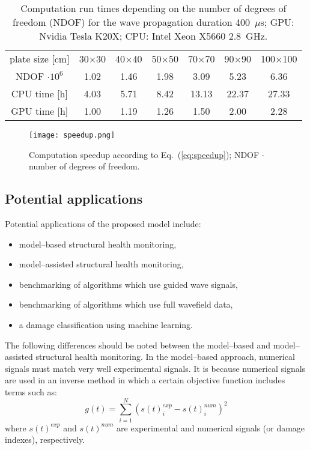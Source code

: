 \documentclass[preprint,12pt]{elsarticle}
\begin{document}
	\begin{table}
		\renewcommand{\arraystretch}{1.3}
		\centering \footnotesize
		\caption{Computation run times depending on the number of degrees of freedom (NDOF) for the wave propagation duration 400~$\mu$s; GPU: Nvidia Tesla K20X; CPU: Intel Xeon X5660 2.8~GHz.}
		\begin{tabular}{ccccccc} 
			\toprule	
			plate size [cm] & 30$\times$30  & 40$\times$40 & 50$\times$50 & 70$\times$70 & 90$\times$90 & 100$\times$100 \\
			NDOF $\cdot 10^6$ & 1.02  & 1.46 & 1.98 & 3.09 & 5.23 & 6.36 \\
			\midrule
			CPU time [h]& 4.03& 5.71 & 8.42 & 13.13 & 22.37 & 27.33\\
			\midrule
			GPU time [h]& 1.00& 1.19 & 1.26 & 1.50 & 2.00 & 2.28\\
			\bottomrule 
		\end{tabular} 
		\label{tab:run_time}
	\end{table}
	
	\begin{figure} [h!]
		\centering
		\texttt{[image: speedup.png]}	
		\caption{Computation speedup according to Eq.~(\ref{eq:speedup}); NDOF - number of degrees of freedom.}
		\label{fig:speedup}
	\end{figure}
	\newpage
	\subsection{Potential applications}
	
	Potential applications of the proposed model include:
	\begin{itemize}
		\item model--based structural health monitoring,
		\item model--assisted structural health monitoring,
		\item benchmarking of algorithms which use guided wave signals,
		\item benchmarking of algorithms which use full wavefield data,
		\item a damage classification using machine learning.
	\end{itemize}
	The following differences should be noted  between the model--based and model--assisted structural health monitoring.
	In the model--based approach, numerical signals must match very well experimental signals. It is because numerical signals are used in an inverse method in which a certain objective function includes terms such as:
	\begin{equation}
	g(t) = \sum_{i=1}^{N} \left(s(t)_i^{exp} - s(t)_i^{num}\right)^2
	\label{eq:obj_fun}
	\end{equation}
	where $s(t)^{exp}$ and $s(t)^{num}$ are experimental and numerical signals (or damage indexes), respectively.
	
\end{document}
